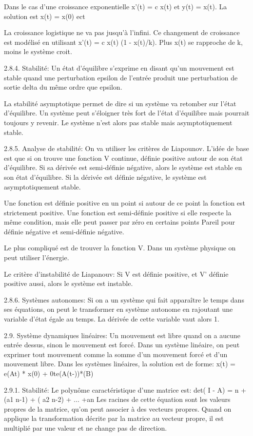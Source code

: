 Dans le cas d’une croissance exponentielle
x'(t) = c x(t) et y(t) = x(t). La solution est x(t) = x(0) ect

La croissance logistique ne va pas jusqu’à l’infini. Ce changement de croissance est modélisé en utilisant x'(t) = c x(t) (1 - x(t)/k). Plus x(t) se rapproche de k, moins le système croit.

2.8.4. Stabilité:
Un état d’équilibre s’exprime en disant qu’un mouvement est stable quand une perturbation epsilon de l’entrée produit une perturbation de sortie delta du même ordre que epsilon.

La stabilité asymptotique permet de dire si un système va retomber sur l’état d’équilibre.
Un système peut s’éloigner très fort de l’état d’équilibre mais pourrait toujours y revenir. Le système n’est alors pas stable mais asymptotiquement stable.

2.8.5. Analyse de stabilité:
On va utiliser les critères de Liapounov.
L’idée de base est que si on trouve une fonction V continue, définie positive autour de son état d’équilibre. Si sa dérivée est semi-définie négative, alors le système est stable en son état d’équilibre. Si la dérivée est définie négative, le système est asymptotiquement stable.

Une fonction est définie positive en un point si autour de ce point la fonction est strictement positive.
Une fonction est semi-définie positive si elle respecte la même condition, mais elle peut passer par zéro en certains points
Pareil pour définie négative et semi-définie négative.

Le plus compliqué est de trouver la fonction V. Dans un système physique on peut utiliser l’énergie.

Le critère d’instabilité de Liapanouv: Si V est définie positive, et V’ définie positive aussi, alors le système est instable.

2.8.6. Systèmes autonomes:
Si on a un système qui fait apparaître le temps dans ses équations, on peut le transformer en système autonome en rajoutant une variable d’état égale au temps. La dérivée de cette variable vaut alors 1.

2.9. Système dynamiques linéaires:
Un mouvement est libre quand on a aucune entrée dessus, sinon le mouvement est forcé.
Dans un système linéaire, on peut exprimer tout mouvement comme la somme d’un mouvement forcé et d’un mouvement libre.
Dans les systèmes linéaires, la solution est de forme:
x(t) = e(At) * x(0) + 0te(A(t-))*(B)

2.9.1. Stabilité:
Le polynôme caractéristique d’une matrice est:
det( I - A) = n + (a1 n-1) + ( a2 n-2) + ... +an
Les racines de cette équation sont les valeurs propres de la matrice, qu’on peut associer à des vecteurs propres. Quand on applique la transformation décrite par la matrice au vecteur propre, il est multiplié par une valeur et ne change pas de direction.


